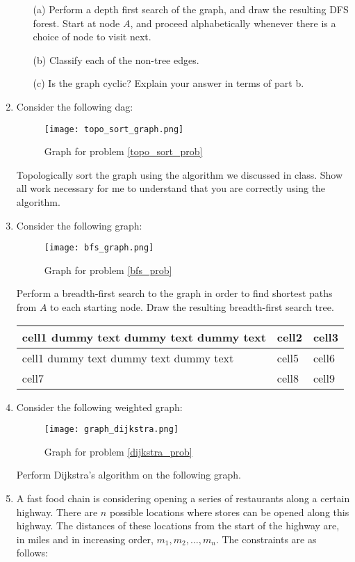 \documentclass[12pt]{article}
\begin{document}
\begin{enumerate}
    \begin{itemize}
        \item[(a)] Perform a depth first search of the graph, and draw the resulting DFS forest. Start at node $A$, and proceed alphabetically whenever there is a choice of node to visit next. 
        \item[(b)] Classify each of the non-tree edges.  
        \item[(c)] Is the graph cyclic? Explain your answer in terms of part b. 
    \end{itemize}
    \label{dfs_prob}
    \newpage
    \item Consider the following dag:
    \begin{figure}[h]
        \centering
        \caption{Graph for problem \ref{topo_sort_prob}}
        \texttt{[image: topo\_sort\_graph.png]}
    \end{figure}
    Topologically sort the graph using the algorithm we discussed in class. Show all work necessary for me to understand that you are correctly using the algorithm. 
    \label{topo_sort_prob}
    \newpage
    \item Consider the following graph: \label{bfs}
    \begin{figure}[h]
        \centering
        \caption{Graph for problem \ref{bfs_prob}}
        \texttt{[image: bfs\_graph.png]}
    \end{figure}
     Perform a breadth-first search to the graph in order to find shortest paths from $A$ to each starting node. Draw the resulting breadth-first search tree.
     \begin{tabular}{ | m{5em} | m{1cm}| m{1cm} | } 
        \hline
        cell1 dummy text dummy text dummy text& cell2 & cell3 \\ 
        \hline
        cell1 dummy text dummy text dummy text & cell5 & cell6 \\ 
        \hline
        cell7 & cell8 & cell9 \\ 
        \hline
      \end{tabular}
    \newpage
    \item Consider the following weighted graph:
    \begin{figure}[h]
        \centering
        \caption{Graph for problem \ref{dijkstra_prob}}
        \texttt{[image: graph\_dijkstra.png]}
    \end{figure}
    Perform Dijkstra's algorithm on the following graph. \label{dijkstra_prob}
    \newpage
    \item A fast food chain is considering opening a series of restaurants along a certain highway. There are $n$ possible locations where stores can be opened along this highway. The distances of these locations from the start of the highway are, in miles and in increasing order, $m_1, m_2, \ldots, m_n$. The constraints are as follows:

\end{enumerate}
\end{document}
